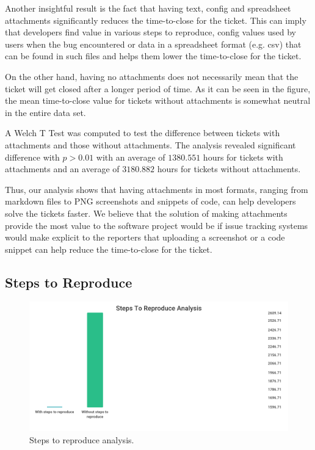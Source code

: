 \documentclass{mpaper}
\begin{document}
Another insightful result is the fact that having text, config and spreadsheet attachments significantly 
reduces the time-to-close for the ticket. This can imply that developers find value in various steps to reproduce, 
config values used by users when the bug encountered or data in a spreadsheet format (e.g. csv) that can be 
found in such files and helps them lower the time-to-close for the ticket.

On the other hand, having no attachments does not necessarily mean that the ticket will get closed after 
a longer period of time. As it can be seen in the figure, the mean time-to-close value for tickets without 
attachments is somewhat neutral in the entire data set.

A Welch T Test was computed to test the difference between tickets with attachments and those 
without attachments. The analysis revealed significant difference with $p > 0.01$ with an
average of $1380.551$ hours for tickets with attachments and an average of $3180.882$ hours
for tickets without attachments. 

Thus, our analysis shows that having attachments in most formats, ranging from markdown files to PNG screenshots 
and snippets of code, can help developers solve the tickets faster. We believe that the solution of making attachments
provide the most value to the software project would be if issue tracking systems would make explicit to the reporters 
that uploading a screenshot or a code snippet can help reduce the time-to-close for the ticket.

\subsection{Steps to Reproduce}

\begin{figure}[ht]
  \begin{center}
    \includegraphics[scale=0.23]{images/steps_to_reproduce.png}
  \end{center}
  \caption{\label{steps}Steps to reproduce analysis.}
\end{figure}
\end{document}
